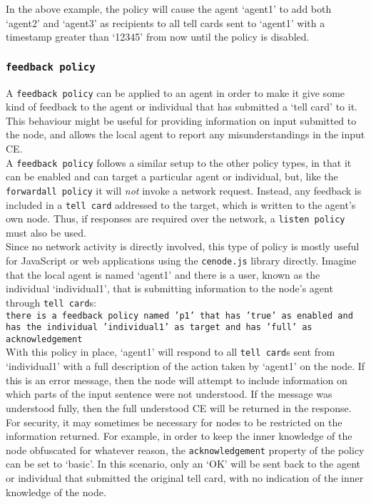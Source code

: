 \documentclass{scrartcl}
\begin{document}
In the above example, the policy will cause the agent `agent1' to add both `agent2' and `agent3' as recipients to all tell cards sent to `agent1' with a timestamp greater than `12345' from now until the policy is disabled.

\subsubsection{\texttt{feedback policy}}
A \texttt{feedback policy} can be applied to an agent in order to make it give some kind of feedback to the agent or individual that has submitted a `tell card' to it. This behaviour might be useful for providing information on input submitted to the node, and allows the local agent to report any misunderstandings in the input CE.\\

A \texttt{feedback policy} follows a similar setup to the other policy types, in that it can be enabled and can target a particular agent or individual, but, like the \texttt{forwardall policy} it will \textit{not} invoke a network request. Instead, any feedback is included in a \texttt{tell card} addressed to the target, which is written to the agent's own node. Thus, if responses are required over the network, a \texttt{listen policy} must also be used.\\

Since no network activity is directly involved, this type of policy is mostly useful for JavaScript or web applications using the \texttt{cenode.js} library directly. Imagine that the local agent is named `agent1' and there is a user, known as the individual `individual1', that is submitting information to the node's agent through \texttt{tell card}s:\\
\texttt{there is a feedback policy named 'p1' that has 'true' as enabled and has the individual 'individual1' as target and has 'full' as acknowledgement}\\

With this policy in place, `agent1' will respond to all \texttt{tell card}s sent from `individual1' with a full description of the action taken by `agent1' on the node. If this is an error message, then the node will attempt to include information on which parts of the input sentence were not understood. If the message was understood fully, then the full understood CE will be returned in the response.\\

For security, it may sometimes be necessary for nodes to be restricted on the information returned. For example, in order to keep the inner knowledge of the node obfuscated for whatever reason, the \texttt{acknowledgement} property of the policy can be set to `basic'. In this scenario, only an `OK' will be sent back to the agent or individual that submitted the original tell card, with no indication of the inner knowledge of the node.\\
\end{document}
